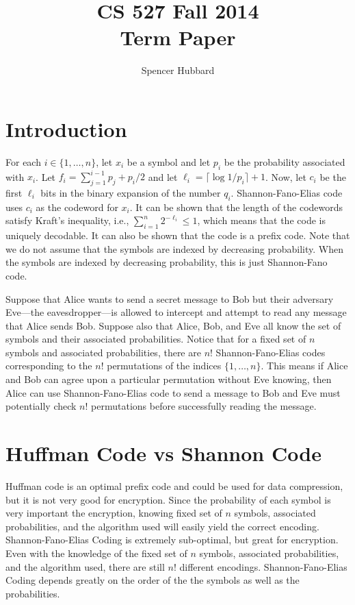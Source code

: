 \documentclass[10pt,letterpaper,notitlepage,draft]{article}
\title{CS 527 Fall 2014\\Term Paper}
\author{Spencer Hubbard} %
\date{} %
\theoremstyle{definition}
\begin{document}
\maketitle


\section{Introduction}
For each $i \in \lbrace 1, \ldots, n\rbrace$, let $x_i$ be a symbol and let $p_i$ be the probability associated with $x_i$. 
Let $f_i = \sum_{j=1}^{i-1} p_j + p_i / 2$ and let $\ell_i = \lceil\log 1 / p_i \rceil + 1$. 
Now, let $c_i$ be the first $\ell_i$ bits in the binary expansion of the number $q_i$. 
Shannon-Fano-Elias code uses $c_i$ as the codeword for $x_i$. 
It can be shown that the length of the codewords satisfy Kraft's inequality, i.e., $\sum_{i=1}^n 2^{-\ell_i} \le 1$, which means that the code is uniquely decodable. 
It can also be shown that the code is a prefix code. 
Note that we do not assume that the symbols are indexed by decreasing probability. 
When the symbols are indexed by decreasing probability, this is just Shannon-Fano code.

Suppose that Alice wants to send a secret message to Bob but their adversary Eve---the eavesdropper---is allowed to intercept and attempt to read any message that Alice sends Bob. 
Suppose also that Alice, Bob, and Eve all know the set of symbols and their associated probabilities. 
Notice that for a fixed set of $n$ symbols and associated probabilities, there are $n!$ Shannon-Fano-Elias codes corresponding to the $n!$ permutations of the indices $\lbrace 1, \dots, n\rbrace$. 
This means if Alice and Bob can agree upon a particular permutation without Eve knowing, then Alice can use Shannon-Fano-Elias code to send a message to Bob and Eve must potentially check $n!$ permutations before successfully reading the message.

\section{Huffman Code vs Shannon Code}
Huffman code is an optimal prefix code and could be used for data compression, but it is not very good for encryption. 
Since the probability of each symbol is very important the encryption, knowing fixed set of $n$ symbols, associated probabilities, and the algorithm used will easily yield the correct encoding. 
Shannon-Fano-Elias Coding is extremely sub-optimal, but great for encryption.
Even with the knowledge of the fixed set of $n$ symbols, associated probabilities, and the algorithm used, there are still $n!$ different encodings. 
Shannon-Fano-Elias Coding depends greatly on the order of the the symbols as well as the probabilities.
\end{document}

